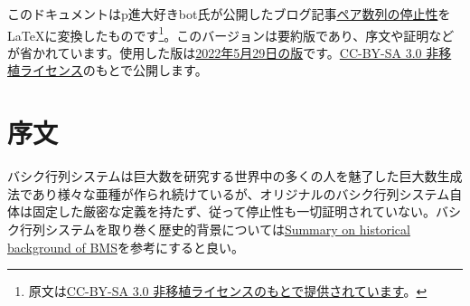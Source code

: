\documentclass[dvipdfmx,uplatex]{jsarticle}
\title{\documenttitle}
\author{
	p進大好きbot 著
	\and
	Naruyoko 編集 %
}
\date{コンパイル日: \today}
\newif\iffull
\theoremstyle{customnonumberbreakfortheorem}
\theoremstyle{customnonumberbreakforproof}
\begin{document}
\maketitle

\renewcommand{\thefootnote}{$\diamondsuit$}

このドキュメントはp進大好きbot氏が公開したブログ記事\href{https://googology.fandom.com/ja/wiki/User\_blog:P\%E9\%80\%B2\%E5\%A4\%A7\%E5\%A5\%BD\%E3\%81\%8Dbot/\%E3\%83\%9A\%E3\%82\%A2\%E6\%95\%B0\%E5\%88\%97\%E3\%81\%AE\%E5\%81\%9C\%E6\%AD\%A2\%E6\%80\%A7}{ペア数列の停止性}を\LaTeX{}に変換したものです\footnote[0]{原文は\href{https://www.fandom.com/ja/licensing-ja}{CC-BY-SA 3.0 非移植ライセンスのもとで提供されています}。}。\iffull\else{このバージョンは要約版であり、序文や証明などが省かれています。}\fi 使用した版は\href{https://googology.fandom.com/ja/wiki/User\_blog:P\%E9\%80\%B2\%E5\%A4\%A7\%E5\%A5\%BD\%E3\%81\%8Dbot/\%E3\%83\%9A\%E3\%82\%A2\%E6\%95\%B0\%E5\%88\%97\%E3\%81\%AE\%E5\%81\%9C\%E6\%AD\%A2\%E6\%80\%A7?oldid=47092}{2022年5月29日の版}です。\href{https://creativecommons.org/licenses/by-sa/3.0/}{CC-BY-SA 3.0 非移植ライセンス}のもとで公開します。

\renewcommand{\thefootnote}{\arabic{footnote}}

\clearpage

\tableofcontents

\iffull

\section{概要}

ペア数列の停止性を示す。より正確には、数あるペア数列システムのうち１つの定式化を記述し、その中で標準形という概念を定義し、標準形のペア数列システムが停止することを証明する\footnote{当初の予定ではペア数列の解析、すなわちペア数列システムに伴う順序数表記系の限界を決定するつもりだったが、停止性の証明までを書き切るだけで大変疲れてしまった上に需要もさほどないと思うため、停止性までに留めた。}。

\fi

\section{序文}

\iffull

バシク行列システムは巨大数を研究する世界中の多くの人を魅了した巨大数生成法であり様々な亜種が作られ続けているが、オリジナルのバシク行列システム自体は固定した厳密な定義を持たず、従って停止性も一切証明されていない。バシク行列システムを取り巻く歴史的背景については\href{https://googology.wikia.com/wiki/User_blog:P\%E9\%80\%B2\%E5\%A4\%A7\%E5\%A5\%BD\%E3\%81\%8Dbot/Summary\_on\_historical\_background\_of\_BMS}{Summary on historical background of BMS}を参考にすると良い。
\end{document}
